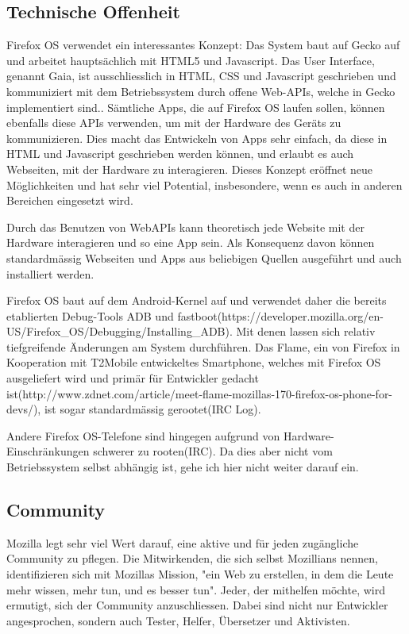 \subsection{Technische Offenheit}
Firefox OS verwendet ein interessantes Konzept: Das System baut auf Gecko auf und arbeitet hauptsächlich mit HTML5 und Javascript. Das User Interface, genannt Gaia, ist ausschliesslich in HTML, CSS und Javascript geschrieben und kommuniziert mit dem Betriebssystem durch offene Web-APIs, welche in Gecko implementiert sind.\cite{online:ff-gaia}. Sämtliche Apps, die auf Firefox OS laufen sollen, können ebenfalls diese APIs verwenden, um mit der Hardware des Geräts zu kommunizieren\cite{online:ff-webapi}. Dies macht das Entwickeln von Apps sehr einfach, da diese in HTML und Javascript geschrieben werden können\cite{online:ff-apps}, und erlaubt es auch Webseiten, mit der Hardware zu interagieren. Dieses Konzept eröffnet neue Möglichkeiten und hat sehr viel Potential, insbesondere, wenn es auch in anderen Bereichen eingesetzt wird.

Durch das Benutzen von WebAPIs kann theoretisch jede Website mit der Hardware interagieren und so eine App sein. Als Konsequenz davon können standardmässig Webseiten und Apps aus beliebigen Quellen ausgeführt und auch installiert werden. 


Firefox OS baut auf dem Android-Kernel auf und verwendet daher die bereits etablierten Debug-Tools ADB und fastboot(https://developer.mozilla.org/en-US/Firefox_OS/Debugging/Installing_ADB). Mit denen lassen sich relativ tiefgreifende Änderungen am System durchführen. Das Flame, ein von Firefox in Kooperation mit T2Mobile entwickeltes Smartphone, welches mit Firefox OS ausgeliefert wird und primär für Entwickler gedacht ist(http://www.zdnet.com/article/meet-flame-mozillas-170-firefox-os-phone-for-devs/), ist sogar standardmässig gerootet(IRC Log).

Andere Firefox OS-Telefone sind hingegen aufgrund von Hardware-Einschränkungen schwerer zu rooten(IRC). Da dies aber nicht vom Betriebssystem selbst abhängig ist, gehe ich hier nicht weiter darauf ein.


\subsection{Community}
Mozilla legt sehr viel Wert darauf, eine aktive und für jeden zugängliche Community zu pflegen\cite{online:mozilla-volunteer}. Die Mitwirkenden, die sich selbst Mozillians nennen, identifizieren sich mit Mozillas Mission, "ein Web zu erstellen, in dem die Leute mehr wissen, mehr tun, und es besser tun"\cite{online:mozilla-community}. 
Jeder, der mithelfen möchte, wird ermutigt, sich der Community anzuschliessen. Dabei sind nicht nur Entwickler angesprochen, sondern auch Tester, Helfer, Übersetzer und Aktivisten\cite{online:mozilla-get-involved}. 

